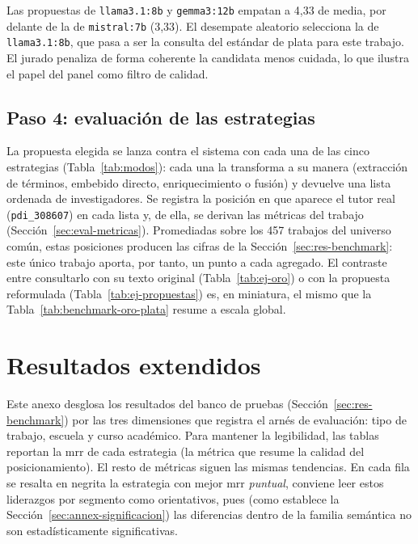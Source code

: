 Las propuestas de \texttt{llama3.1:8b} y \texttt{gemma3:12b} empatan a 4,33 de media, por delante de la de \texttt{mistral:7b} (3,33).
El desempate aleatorio selecciona la de \texttt{llama3.1:8b}, que pasa a ser la consulta del estándar de plata para este trabajo.
El jurado penaliza de forma coherente la candidata menos cuidada, lo que ilustra el papel del panel como filtro de calidad.

\section*{Paso 4: evaluación de las estrategias}

La propuesta elegida se lanza contra el sistema con cada una de las cinco estrategias (Tabla~\ref{tab:modos}): cada una la transforma a su manera (extracción de términos, embebido directo, enriquecimiento o fusión) y devuelve una lista ordenada de investigadores.
Se registra la posición en que aparece el tutor real (\texttt{pdi\_308607}) en cada lista y, de ella, se derivan las métricas del trabajo (Sección~\ref{sec:eval-metricas}).
Promediadas sobre los 457 trabajos del universo común, estas posiciones producen las cifras de la Sección~\ref{sec:res-benchmark}: este único trabajo aporta, por tanto, un punto a cada agregado.
El contraste entre consultarlo con su texto original (Tabla~\ref{tab:ej-oro}) o con la propuesta reformulada (Tabla~\ref{tab:ej-propuestas}) es, en miniatura, el mismo que la Tabla~\ref{tab:benchmark-oro-plata} resume a escala global.

\chapter{Resultados extendidos}
\label{annex:resultados-extendidos}

Este anexo desglosa los resultados del banco de pruebas (Sección~\ref{sec:res-benchmark}) por las tres dimensiones que registra el arnés de evaluación: tipo de trabajo, escuela y curso académico.
Para mantener la legibilidad, las tablas reportan la \gls{mrr} de cada estrategia (la métrica que resume la calidad del posicionamiento).
El resto de métricas siguen las mismas tendencias.
En cada fila se resalta en negrita la estrategia con mejor \gls{mrr} \emph{puntual}, conviene leer estos liderazgos por segmento como orientativos, pues (como establece la Sección~\ref{sec:annex-significacion}) las diferencias dentro de la familia semántica no son estadísticamente significativas.

